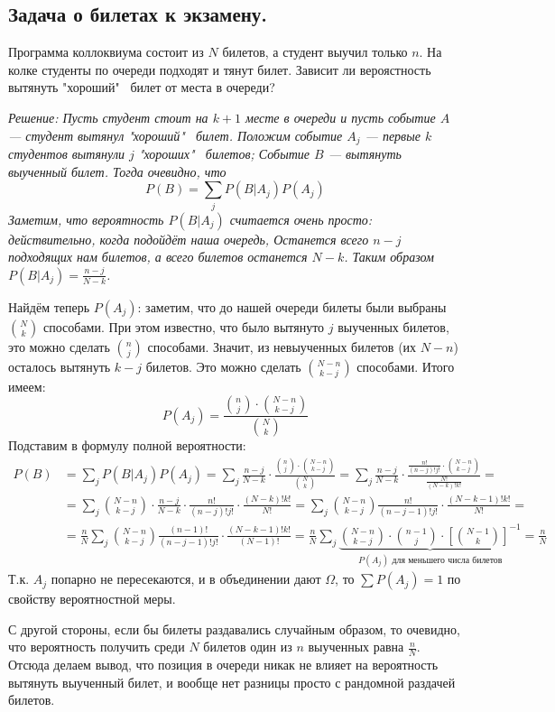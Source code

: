 \subsection{Задача о билетах к экзамену.}
\begin{problem}
    Программа коллоквиума состоит из $N$ билетов, а студент выучил только $n$. На колке студенты
    по очереди подходят и тянут билет. Зависит ли вероястность вытянуть "хороший" \ билет от места
    в очереди?

    \it{Решение:} Пусть студент стоит на $k + 1$ месте в очереди и пусть событие $A$ ---
    студент вытянул "хороший" \ билет. Положим событие $A_j$ --- первые $k$ студентов вытянули
    $j$ "хороших" \ билетов; Событие $B$ --- вытянуть выученный билет. Тогда очевидно, что
    \[
        P(B) = \sum\limits_{j} P(B | A_j) P(A_j)
    \]
    Заметим, что вероятность $P(B | A_j)$ считается очень просто: действительно, когда подойдёт наша очередь,
    Останется всего $n - j$ подходящих нам билетов, а всего билетов останется $N - k$. Таким образом
    $P(B |A_j) = \frac{n - j}{N - k}$.

    Найдём теперь $P(A_j)$: заметим, что до нашей очереди билеты были выбраны $\binom{N}{k}$ способами.
    При этом известно, что было вытянуто $j$ выученных билетов, это можно сделать $\binom{n}{j}$ способами.
    Значит, из невыученных билетов (их $N - n$) осталось вытянуть $k - j$ билетов. Это можно сделать
    $\binom{N - n}{k - j}$ способами. Итого имеем:
    \[
        P(A_j) = \frac{\binom{n}{j} \cdot \binom{N - n}{k - j}}{\binom{N}{k}}
    \]
    Подставим в формулу полной вероятности:
    \begin{align*}
        P(B) &= \sum\limits_{j} P(B | A_j) P(A_j) =
        \sum\limits_{j} \frac{n - j}{N - k} \cdot
        \frac{\binom{n}{j} \cdot \binom{N - n}{k - j}}{\binom{N}{k}} =
        \sum\limits_{j} \frac{n - j}{N - k} \cdot
        \frac{\frac{n!}{(n - j)!j!} \cdot \binom{N - n}{k - j}}{\frac{N!}{(N - k)!k!}} =\\
        &=\sum\limits_{j} \binom{N - n}{k - j} \cdot \frac{n - j}{N - k} \cdot
        \frac{n!}{(n - j)!j!} \cdot \frac{(N - k)!k!}{N!} =
        \sum\limits_{j} \binom{N - n}{k - j} \frac{n!}{(n - j - 1)!j!}
        \cdot \frac{(N - k - 1)!k!}{N!} =\\
        &=\frac{n}{N}\sum\limits_{j}\binom{N - n}{k - j} \frac{(n - 1)!}{(n - j - 1)!j!}
        \cdot \frac{(N - k - 1)!k!}{(N - 1)!} =
        \frac{n}{N}\sum\limits_{j}\underbrace{\binom{N - n}{k - j} \cdot \binom{n - 1}{j}
        \cdot \left[ \binom{N - 1}{k} \right]^{-1}}_{P(A_j) \text{ для меньшего числа билетов}}=
        \frac{n}{N}
    \end{align*}
    Т.к. $A_j$ попарно не пересекаются, и в объединении дают $\Omega$, то $\sum P(A_j) = 1$ по свойству вероятностной меры.

    С другой стороны, если бы билеты раздавались случайным образом, то очевидно, что вероятность
    получить среди $N$ билетов один из $n$ выученных равна $\frac{n}{N}$. Отсюда делаем вывод,
    что позиция в очереди никак не влияет на вероятность вытянуть выученный билет, и вообще нет
    разницы просто с рандомной раздачей билетов.
\end{problem}

